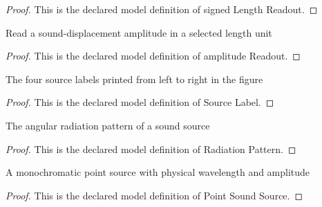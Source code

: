 \begin{proof}
  This is the declared model definition of signed Length Readout.
\end{proof}
\begin{definition}
  \label{def:physics:phyx-mini-0313:phyxminiproblems-problemphyxmini0313-amplitudereadout}
  Read a sound-displacement amplitude in a selected length unit
\end{definition}
\begin{proof}
  This is the declared model definition of amplitude Readout.
\end{proof}
\begin{definition}
  \label{def:physics:phyx-mini-0313:phyxminiproblems-problemphyxmini0313-sourcelabel}
  The four source labels printed from left to right in the figure
\end{definition}
\begin{proof}
  This is the declared model definition of Source Label.
\end{proof}
\begin{definition}
  \label{def:physics:phyx-mini-0313:phyxminiproblems-problemphyxmini0313-radiationpattern}
  The angular radiation pattern of a sound source
\end{definition}
\begin{proof}
  This is the declared model definition of Radiation Pattern.
\end{proof}
\begin{definition}
  \label{def:physics:phyx-mini-0313:phyxminiproblems-problemphyxmini0313-pointsoundsource}
  A monochromatic point source with physical wavelength and amplitude
\end{definition}
\begin{proof}
  This is the declared model definition of Point Sound Source.
\end{proof}
